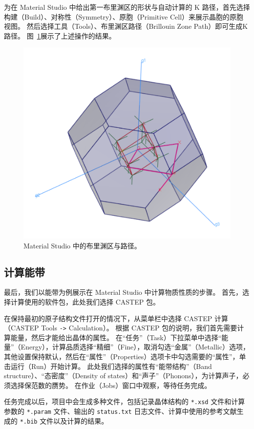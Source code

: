 为在 Material Studio 中给出第一布里渊区的形状与自动计算的 K 路径，首先选择构建（Build）、对称性（Symmetry）、原胞（Primitive Cell）来展示晶胞的原胞视图。
然后选择工具（Tools）、布里渊区路径（Brillouin Zone Path）即可生成K路径。
图~\ref{ref:ms-brillouin-zone}展示了上述操作的结果。

\begin{figure}[ht!]
    \centering
    \includegraphics[width=0.8\linewidth]{screenshots/reciprocal.png}
    \caption{Material Studio 中的布里渊区与路径。}
    \label{ref:ms-brillouin-zone}
\end{figure}

\subsection{计算能带}

最后，我们以能带为例展示在 Material Studio 中计算物质性质的步骤。
首先，选择计算使用的软件包，此处我们选择 CASTEP 包。

在保持最初的原子结构文件打开的情况下，从菜单栏中选择 CASTEP 计算（CASTEP Tools \verb|->| Calculation）。
根据 CASTEP 包的说明，我们首先需要计算能量，然后才能给出晶体的属性。
在“任务”（Task）下拉菜单中选择“能量”（Energy），计算品质选择“精细”（Fine），取消勾选“金属”（Metallic）选项，其他设置保持默认，然后在“属性”（Properties）选项卡中勾选需要的“属性”，单击运行（Run）开始计算。
此处我们选择的属性有“能带结构”（Band structure）、“态密度”（Density of states）和“声子”（Phonons），为计算声子，必须选择保范数的赝势。
在作业（Jobs）窗口中观察，等待任务完成。

任务完成以后，项目中会生成多种文件，包括记录晶体结构的 \verb|*.xsd| 文件和计算参数的 \verb|*.param| 文件、输出的 \verb|status.txt| 日志文件、计算中使用的参考文献生成的 \verb|*.bib| 文件以及计算的结果。

